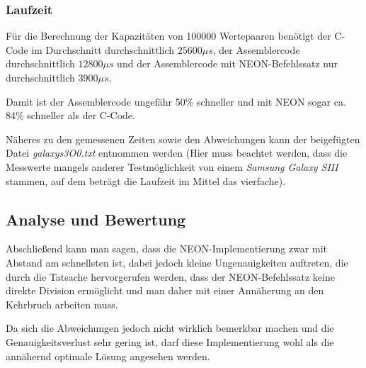 \documentclass[11pt]{scrartcl}
\begin{document}
\subsubsection{Laufzeit}
Für die Berechnung der Kapazitäten von 100000 Wertepaaren benötigt der C-Code im Durchschnitt durchschnittlich $25600 \mu s$, der Assemblercode durchschnittlich $12800 \mu s$ und der Assemblercode mit NEON-Befehlssatz nur durchschnittlich $3900 \mu s$.

Damit ist der Assemblercode ungefähr 50\% schneller und mit NEON sogar ca. 84\% schneller als der C-Code.

Näheres zu den gemessenen Zeiten sowie den Abweichungen kann der beigefügten Datei \emph{galaxys3O0.txt} entnommen werden (Hier muss beachtet werden, dass die Messwerte mangels anderer Testmöglichkeit von einem \emph{Samsung Galaxy SIII} stammen, auf dem \board beträgt die Laufzeit im Mittel das vierfache).

\subsection{Analyse und Bewertung}
Abschließend kann man sagen, dass die NEON-Implementierung zwar mit Abstand am schnellsten ist, dabei jedoch kleine Ungenauigkeiten auftreten, die durch die Tatsache hervorgerufen werden, dass der NEON-Befehlssatz keine direkte Division ermöglicht und man daher mit einer Annäherung an den Kehrbruch arbeiten muss.

Da sich die Abweichungen jedoch nicht wirklich bemerkbar machen und die Genauigkeitsverlust sehr gering ist, darf diese Implementierung wohl als die annähernd optimale Lösung angesehen werden. 
\end{document}
